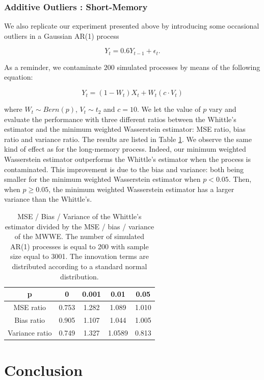 \documentclass[
  11pt,
]{article}
\begin{document}
\hypertarget{additive-outliers-short-memory}{%
\subsubsection{Additive Outliers :
Short-Memory}\label{additive-outliers-short-memory}}

We also replicate our experiment presented above by introducing some
occasional outliers in a Gaussian AR(1) process

\[Y_t = 0.6Y_{t-1} + \epsilon_t.\]

As a reminder, we contaminate \(200\) simulated processes
by means of the following equation:

\[Y_{t}=\left(1-W_{t}\right) X_{t}+W_{t}\left(c \cdot V_{t}\right)\]

where \(W_t \sim Bern(p)\), \(V_t \sim t_2\) and \(c = 10\). We let the
value of \(p\) vary and evaluate the performance with three different
ratios between the Whittle's estimator and the minimum weighted
Wasserstein estimator: MSE ratio, bias ratio and variance ratio. The
results are listed in Table \ref{tab:outliers_AR1}. We observe the same
kind of effect as for the long-memory process. Indeed, our minimum
weighted Wasserstein estimator outperforms the Whittle's estimator when
the process is contaminated. This improvement is due to the bias and
variance: both being smaller for the minimum weighted Wasserstein
estimator when \(p <0.05\). Then, when \(p \geq 0.05\), the minimum
weighted Wasserstein estimator has a larger variance than the Whittle's.

\begin{table}[h]
\centering
\begin{tabular}{|c|c|c|c|c|}
\hline
p  &  0  & 0.001   & 0.01    & 0.05 \\
\hline
MSE ratio  & 0.753 & 1.282 & 1.089 & 1.010 \\
\hline
Bias ratio & 0.905 & 1.107 & 1.044 & 1.005\\
\hline 
Variance ratio & 0.749 & 1.327 & 1.0589 & 0.813 \\ 
\hline
\end{tabular}
\caption{MSE / Bias / Variance of the Whittle's estimator divided by the MSE / bias / variance of the MWWE. The number of simulated AR(1) processes is equal to 200 with sample size equal to 3001. The innovation terms are distributed according to a standard normal distribution.}
\label{tab:outliers_AR1}
\end{table}

\hypertarget{conclusion}{%
\section{Conclusion}\label{conclusion}}
\end{document}
